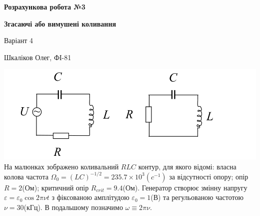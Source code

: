 \documentclass[a4paper, 12pt]{article}
\begin{document}
\begin{center}
    \textbf{Розрахункова робота №3}

    \textbf{Згасаючі або вимушені коливання}
\end{center}

\begin{flushright}
    Варіант 4

    Шкаліков Олег, ФІ-81
\end{flushright}

\includegraphics[width=1.0\textwidth]{graphics/RLC.png}
На малюнках зображено коливальний $RLC$ контур, для якого відомі:
власна колова частота $\Omega_0 = (LC)^{-1/2} = 235.7 \times 10^3(c^{-1})$ за відсутності опору;
опір $R = 2$(Ом); критичний опір $R_{crit} = 9.4$(Ом). 
Генератор створює змінну напругу $\varepsilon  = \varepsilon_0 \cos{2\pi \nu t}$
з фіксованою амплітудою $\varepsilon_0 = 1$(В) та регульованою частотою $\nu = 30$(кГц). 
В подальшому позначимо $\omega \equiv 2 \pi \nu$.
\end{document}
